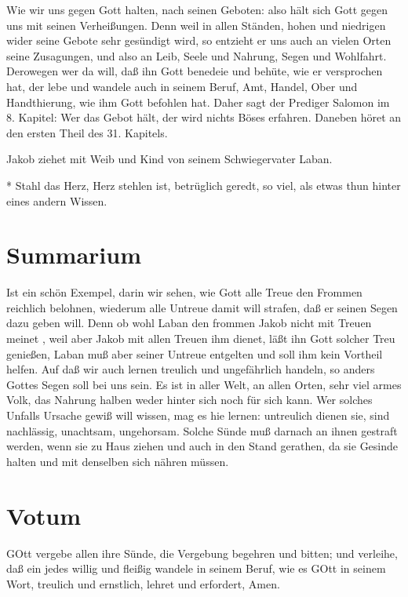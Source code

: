 Wie wir uns gegen Gott halten, nach seinen Geboten: also hält sich Gott gegen uns mit seinen Verheißungen. Denn weil in allen Ständen, hohen und niedrigen wider seine Gebote sehr gesündigt wird, so entzieht er uns auch an vielen Orten seine Zusagungen, und also an Leib, Seele und Nahrung, Segen und Wohlfahrt. Derowegen wer da will, daß ihn Gott benedeie und behüte, wie er versprochen hat, der lebe und wandele auch in seinem Beruf, Amt, Handel, Ober und Handthierung, wie ihm Gott befohlen hat. Daher sagt der Prediger Salomon im 8. Kapitel: Wer das Gebot hält, der wird nichts Böses erfahren. Daneben höret an den ersten Theil des 31. Kapitels.

Jakob ziehet mit Weib und Kind von seinem Schwiegervater Laban.

* Stahl das Herz, Herz stehlen ist, betrüglich geredt, so viel, als etwas thun hinter eines andern Wissen.

\section{Summarium}

Ist ein schön Exempel, darin wir sehen, wie Gott alle Treue den Frommen reichlich belohnen, wiederum alle Untreue damit will strafen, daß er seinen Segen dazu geben will. Denn ob wohl Laban den frommen Jakob nicht mit Treuen meinet
, weil aber Jakob mit allen Treuen ihm dienet, läßt ihn Gott solcher Treu genießen, Laban muß aber seiner Untreue entgelten und soll ihm kein Vortheil helfen. Auf daß wir auch lernen treulich und ungefährlich handeln, so anders Gottes Segen soll bei uns sein. Es ist in aller Welt, an allen Orten, sehr viel armes Volk, das Nahrung halben weder hinter sich noch für sich kann. Wer solches Unfalls Ursache gewiß will wissen, mag es hie lernen: untreulich dienen sie, sind nachlässig, unachtsam, ungehorsam. Solche Sünde muß darnach an ihnen gestraft werden, wenn sie zu Haus ziehen und auch in den Stand gerathen, da sie Gesinde halten und mit denselben sich nähren müssen.

\section{Votum}

GOtt vergebe allen ihre Sünde, die Vergebung begehren und bitten; und verleihe, daß ein jedes willig und fleißig wandele in seinem Beruf, wie es GOtt in seinem Wort, treulich und ernstlich, lehret und erfordert, Amen.

